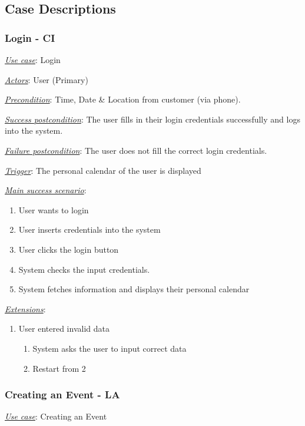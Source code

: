 \documentclass[a4paper]{article}
\begin{document}
\break
\subsection{Case Descriptions}
\subsubsection{Login - CI}
\underline{\textit{Use case}}: Login

\underline{\textit{Actors}}: User (Primary)

\underline{\textit{Precondition}}: Time, Date \& Location from customer (via phone).

\underline{\textit{Success postcondition}}: The user fills in their login credentials successfully and logs into the system.

\underline{\textit{Failure postcondition}}: The user does not fill the correct login credentials.

\underline{\textit{Trigger}}: The personal calendar of the user is displayed

\underline{\textit{Main success scenario}}: 
\begin{enumerate}[leftmargin = 3em]
    \item User wants to login
    \item User inserts credentials into the system
    \item User clicks the login button
    \item System checks the input credentials.
    \item System fetches information and displays their personal calendar
\end{enumerate} 

\underline{\textit{Extensions}}:
\begin{enumerate}[label=3\alph*, leftmargin = 3em]
    \item User entered invalid data \begin{enumerate}[label=\arabic*.]
        \item System asks the user to input correct data
        \item Restart from 2
    \end{enumerate}
\end{enumerate}

\subsubsection{Creating an Event - LA}
\underline{\textit{Use case}}: Creating an Event
\end{document}
